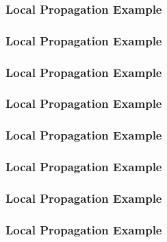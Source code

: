 \documentclass{beamer}
\begin{document}
\begin{frame}
  \frametitle{Local Propagation Example}
  \begin{center}
    
  \end{center}
\end{frame}

\begin{frame}
  \frametitle{Local Propagation Example}
  \begin{center}
    
  \end{center}
\end{frame}

\begin{frame}
  \frametitle{Local Propagation Example}
  \begin{center}
    
  \end{center}
\end{frame}

\begin{frame}
  \frametitle{Local Propagation Example}
  \begin{center}
    
  \end{center}
\end{frame}

\begin{frame}
  \frametitle{Local Propagation Example}
  \begin{center}
    
  \end{center}
\end{frame}

\begin{frame}
  \frametitle{Local Propagation Example}
  \begin{center}
    
  \end{center}
\end{frame}

\begin{frame}
  \frametitle{Local Propagation Example}
  \begin{center}
    
  \end{center}
\end{frame}

\begin{frame}
  \frametitle{Local Propagation Example}
  \begin{center}
    
  \end{center}
\end{frame}
\end{document}
